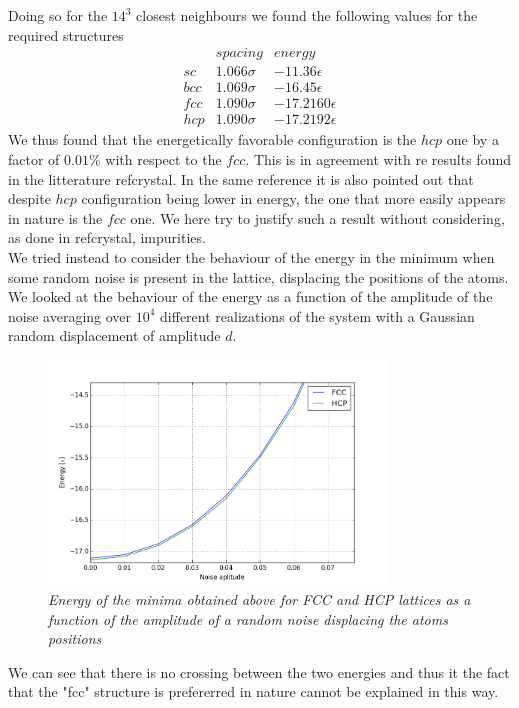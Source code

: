\documentclass[a4paper]{article}
\begin{document}
Doing so for the $14^3$ closest neighbours we found the following values for the required structures
\begin{eqnarray*}
&spacing&energy\\
sc&1.066\sigma&-11.36\epsilon\\
bcc&1.069\sigma&-16.45\epsilon\\
fcc&1.090\sigma&-17.2160\epsilon\\
hcp&1.090\sigma&-17.2192\epsilon
\end{eqnarray*}
We thus found that the energetically favorable configuration is the $hcp$ one by a factor of $0.01\%$ with respect to the $fcc$.
This is in agreement with re results found in the litterature ref{crystal}. 
In the same reference it is also pointed out that despite $hcp$ configuration being lower in energy, the one that more easily appears in nature is the $fcc$ one.
We here try to justify such a result without considering, as done in ref{crystal}, impurities.\\
We tried instead to consider the behaviour of the energy in the minimum when some random noise is present in the lattice, displacing the positions of the atoms.
We looked at the behaviour of the energy as a function of the amplitude of the noise averaging over $10^4$ different realizations of the system with a Gaussian random displacement of amplitude $d$.

\begin{figure}[ht]
    \centering
    \includegraphics[width=9cm]{energy_noise.png}
    \caption{\it \label{noise}Energy of the minima obtained above for FCC and HCP lattices as a function of the amplitude of a random noise displacing the atoms positions}
    \end{figure}
\clearpage    

We can see that there is no crossing between the two energies and thus it the fact that the "fcc" structure is prefererred in nature cannot be explained in this way.
\end{document}
